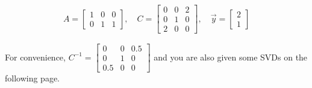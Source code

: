 \begin{align*}
A = \begin{bmatrix}
1 & 0 & 0 \\
0& 1 & 1
\end{bmatrix}, \quad
C = \begin{bmatrix}
0 & 0 & 2\\
0 & 1 & 0 \\
2 & 0 & 0
\end{bmatrix}, \quad
\vec{y} = \begin{bmatrix}
2 \\
1
\end{bmatrix}
\end{align*}

For convenience, $C^{-1} = \begin{bmatrix}
0 & 0 & 0.5\\
0 & 1 & 0 \\
0.5 & 0 & 0
\end{bmatrix}$ and you are also given some SVDs on the following page.

